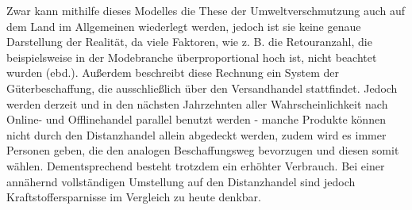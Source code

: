 \begin{folding}
\begin{itemize}
\end{itemize}
Zwar kann mithilfe dieses Modelles die These der Umweltverschmutzung auch auf dem Land im Allgemeinen wiederlegt werden, jedoch ist sie keine genaue Darstellung der Realität, da viele Faktoren, wie z. B. die Retouranzahl, die beispielsweise in der Modebranche überproportional hoch ist, nicht beachtet wurden (ebd.). Außerdem beschreibt diese Rechnung ein System der Güterbeschaffung, die ausschließlich über den Versandhandel stattfindet. Jedoch werden derzeit und in den nächsten Jahrzehnten aller Wahrscheinlichkeit nach Online- und Offlinehandel parallel benutzt werden - manche Produkte können nicht durch den Distanzhandel allein abgedeckt werden, zudem wird es immer Personen geben, die den analogen Beschaffungsweg bevorzugen und diesen somit wählen. Dementsprechend besteht trotzdem ein erhöhter Verbrauch. Bei einer annähernd vollständigen Umstellung auf den Distanzhandel  sind jedoch Kraftstoffersparnisse im Vergleich zu heute denkbar.

\end{folding}

